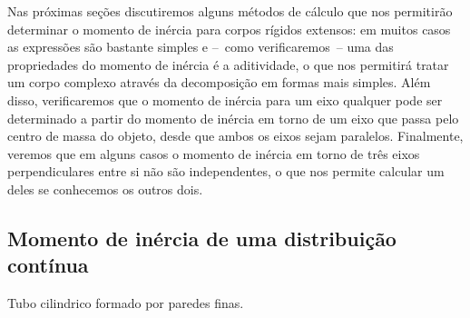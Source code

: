 Nas próximas seções discutiremos alguns métodos de cálculo que nos permitirão determinar o momento de inércia para corpos rígidos extensos: em muitos casos as expressões são bastante simples e --~como verificaremos~-- uma das propriedades do momento de inércia é a aditividade, o que nos permitirá tratar um corpo complexo através da decomposição em formas mais simples. Além disso, verificaremos que o momento de inércia para um eixo qualquer pode ser determinado a partir do momento de inércia em torno de um eixo que passa pelo centro de massa do objeto, desde que ambos os eixos sejam paralelos. Finalmente, veremos que em alguns casos o momento de inércia em torno de três eixos perpendiculares entre si não são independentes, o que nos permite calcular um deles se conhecemos os outros dois.

\subsection{Momento de inércia de uma distribuição contínua}

\begin{marginfigure}
\centering
{}
\caption{Tubo cilindrico formado por paredes finas. \label{Fig:MomInerciaTubo}}
\end{marginfigure}

